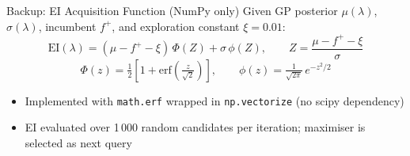 \documentclass[t,english]{beamer}
\begin{document}
\begin{frame}{Backup: EI Acquisition Function (NumPy only)}
  Given GP posterior $\mu(\lambda)$, $\sigma(\lambda)$, incumbent $f^+$,
  and exploration constant $\xi{=}0.01$:
  \[
    \mathrm{EI}(\lambda)
    = (\mu - f^+ - \xi)\,\Phi(Z)
      + \sigma\,\phi(Z),
    \qquad
    Z = \frac{\mu - f^+ - \xi}{\sigma}
  \]
  \[
    \Phi(z) = \tfrac{1}{2}\!\left[1 + \mathrm{erf}\!\left(\tfrac{z}{\sqrt{2}}\right)\right],
    \qquad
    \phi(z) = \tfrac{1}{\sqrt{2\pi}}\,e^{-z^2/2}
  \]
  \begin{itemize}
    \item Implemented with \texttt{math.erf} wrapped in \texttt{np.vectorize}
          (no scipy dependency)
    \item EI evaluated over 1\,000 random candidates per iteration;
          maximiser is selected as next query
  \end{itemize}
\end{frame}
\end{document}
